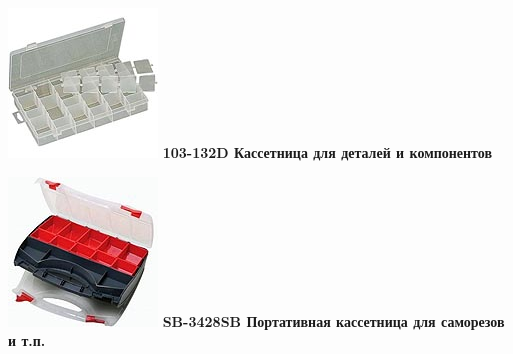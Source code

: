 {

\begin{multicols}{2}

\noindent\includegraphics[width=\columnwidth]{00/fig/pros/103-132D.jpg}
\textbf{103-132D Кассетница для деталей и компонентов}

\noindent\includegraphics[width=\columnwidth]{00/fig/pros/SB-3428SB.jpg}
\textbf{SB-3428SB Портативная кассетница для саморезов и т.п.}
\end{multicols}

}
